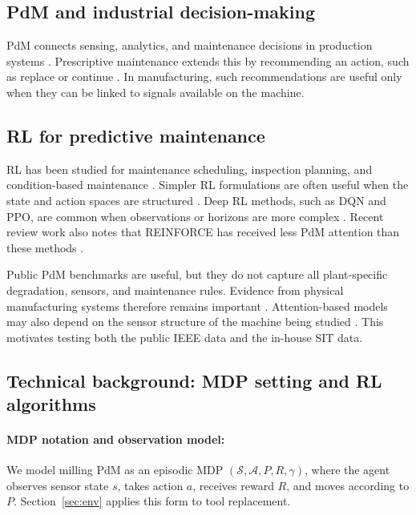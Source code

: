 \documentclass[sn-basic]{sn-jnl}%
\begin{document}
\subsection{PdM and industrial decision-making}
PdM connects sensing, analytics, and maintenance decisions in production systems \cite{Compare2020, Zonta2020}. Prescriptive maintenance extends this by recommending an action, such as replace or continue \cite{Ansari2019}. In manufacturing, such recommendations are useful only when they can be linked to signals available on the machine.

\subsection{RL for predictive maintenance}
RL has been studied for maintenance scheduling, inspection planning, and condition-based maintenance \cite{Siraskar2023, Ogunfowora2023, Zhang2024}. Simpler RL formulations are often useful when the state and action spaces are structured \cite{Adsule2020, Yousefi2020, Rasay2024, Dadash2024}. Deep RL methods, such as DQN and PPO, are common when observations or horizons are more complex \cite{Liu2020, Chen2023, Lee2022, Ong2022-02}. Recent review work also notes that \textsc{REINFORCE} has received less PdM attention than these methods \cite{Siraskar2025}.

Public PdM benchmarks are useful, but they do not capture all plant-specific degradation, sensors, and maintenance rules. Evidence from physical manufacturing systems therefore remains important \cite{Andrade2021Aircraft,Dangut2022RareFailure,Chen2024DigitalTwin}. Attention-based models may also depend on the sensor structure of the machine being studied \cite{Zhao2024}. This motivates testing both the public IEEE data and the in-house SIT data.

\subsection{Technical background: MDP setting and RL algorithms}
\label{sec:tech_background}
\paragraph{MDP notation and observation model:}
We model milling PdM as an episodic MDP $(\mathcal{S},\mathcal{A},P,R,\gamma)$, where the agent observes sensor state $s$, takes action $a$, receives reward $R$, and moves according to $P$. Section~\ref{sec:env} applies this form to tool replacement.
\end{document}
